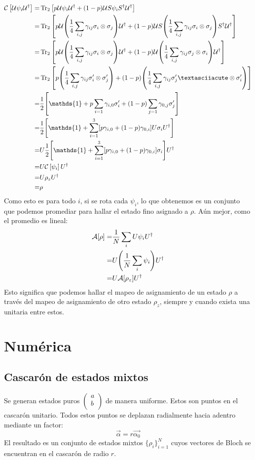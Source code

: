 \documentclass[onecolumn,11pt]{article}
\newcommand{\mcU}{\mathcal{U}}
\newcommand{\mcC}{\mathcal{C}}
\newcommand{\mcA}{\mathcal{A}}
\newcommand{\Id}{\mathds{1}}%
\newcommand{\CG}[1]{\mcC\left[#1\right]}
\begin{document}
\begin{align*}
\CG{\mcU \psi_{i} \mcU^{\dag}}=&\Tr_{2}\qty[p\mcU\psi_{i}\mcU^{\dag}+(1-p)\mcU S \psi_{i} S^{\dag}\mcU^{\dag}]\\
=&\Tr_{2}\qty[p\mcU\qty(\frac{1}{4}\sum_{i,j}\gamma_{ij} \sigma_i\otimes\sigma_j)\mcU^{\dag}+(1-p)\mcU S \qty(\frac{1}{4}\sum_{i,j}\gamma_{ij} \sigma_i\otimes\sigma_j) S^{\dag}\mcU^{\dag}]\\
=&\Tr_{2}\qty[p\mcU\qty(\frac{1}{4}\sum_{i,j}\gamma_{ij} \sigma_i\otimes\sigma_j)\mcU^{\dag}+(1-p)\mcU \qty(\frac{1}{4}\sum_{i,j}\gamma_{ij} \sigma_j\otimes\sigma_i)\mcU^{\dag}]\\
=&\Tr_{2}\qty[p\qty(\frac{1}{4}\sum_{i,j}\gamma_{ij} \sigma_{i}'\otimes\sigma_{j}')+(1-p)\qty(\frac{1}{4}\sum_{i,j}\gamma_{ij} \sigma_{j}'´\otimes\sigma_{i}')]\\
=&\frac{1}{2}\qty[\Id +p\sum_{i=1}\gamma_{i,0}\sigma_{i}'+(1-p)\sum_{j=1}\gamma_{0,j}\sigma_{j}']\\
=&\frac{1}{2}\qty[\Id + \sum_{i=1}^3[p\gamma_{i,0}+(1-p)\gamma_{0,i}]U\sigma_{i}U^{\dag}]\\
=&U\frac{1}{2}\qty[\Id + \sum_{i=1}^3[p\gamma_{i,0}+(1-p)\gamma_{0,i}]\sigma_{i}]U^{\dag}\\
=&U\CG{\psi_{i}}U^{\dag}\\
=&U\rho_{z}U^{\dag}\\
=&\rho
\end{align*}
Como esto es para todo $i$, si se rota cada $\psi_{i}$, lo que obtenemos es un conjunto que podemos promediar para hallar el estado fino asignado a $\rho$. Aún mejor, como el promedio es lineal:
\begin{align}
\mcA[\rho]=&\frac{1}{N}\sum_{i}U\psi_{i}U^{\dag}\\
=&U\qty(\frac{1}{N}\sum_{i}\psi_{i})U^{\dag}\\
=&U\mcA[\rho_{z}]U^{\dag}
\end{align}
Esto significa que podemos hallar el mapeo de asignamiento de un estado $\rho$ a través del mapeo de asignamiento de otro estado $\rho_{z}$, siempre y cuando exista una unitaria entre estos.

\section{Numérica}
\subsection{Cascarón de estados mixtos}
Se generan estados puros $\begin{pmatrix}
a\\
b\\ \end{pmatrix}$ de manera uniforme. Estos son puntos en el cascarón unitario. Todos estos puntos se deplazan radialmente hacia adentro mediante un factor:
\begin{equation}
\vec{\alpha}=r\vec{\alpha_{0}}
\end{equation}
El resultado es un conjunto de estados mixtos $\{\rho_{i}\}_{i=1}^{N}$ cuyos vectores de Bloch se encuentran en el cascarón de radio $r$.
\end{document}
